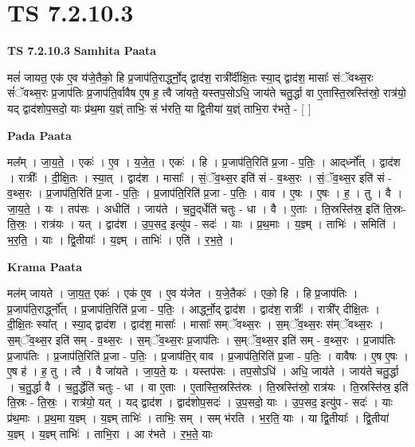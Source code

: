 \documentclass[17pt]{extarticle}
\begin{document}
\section{ TS 7.2.10.3 }

\textbf{TS 7.2.10.3 } \newline
\textbf{Samhita Paata} \newline

मलं॑ जायत॒ एक॑ ए॒व य॑जे॒तैको॒ हि प्र॒जाप॑ति॒रार्द्ध्नो॒द् द्वाद॑श॒ रात्री᳚र्दीक्षि॒तः स्या॒द् द्वाद॑श॒ मासाः᳚ संॅवथ्स॒रः सं॑ॅवथ्स॒रः प्र॒जाप॑तिः प्र॒जाप॑ति॒र्वावैष ए॒ष ह॒ त्वै जा॑यते॒ यस्तप॒सोऽधि॒ जाय॑ते चतु॒र्द्धा वा ए॒तास्ति॒स्रस्ति॑स्रो॒ रात्र॑यो॒ यद् द्वाद॑शोप॒सदो॒ याः प्र॑थ॒मा य॒ज्ञ्ं ताभिः॒ सं भ॑रति॒ या द्वि॒तीया॑ य॒ज्ञ्ं ताभि॒रा र॑भते॒ - [  ] \newline

\textbf{Pada Paata} \newline

मल᳚म् । जा॒य॒ते॒ । एकः॑ । ए॒व । य॒जे॒त॒ । एकः॑ । हि । प्र॒जाप॑ति॒रिति॑ प्र॒जा - प॒तिः॒ । आद्‌र्ध्नो᳚त् । द्वाद॑श । रात्रीः᳚ । दी॒क्षि॒तः । स्या॒त् । द्वाद॑श । मासाः᳚ । सं॒ॅव॒थ्स॒र इति॑ सं - व॒थ्स॒रः । सं॒ॅव॒थ्स॒र इति॑ सं - व॒थ्स॒रः । प्र॒जाप॑ति॒रिति॑ प्र॒जा - प॒तिः॒ । प्र॒जाप॑ति॒रिति॑ प्र॒जा - प॒तिः॒ । वाव । ए॒षः । ए॒षः । ह॒ । तु । वै । जा॒य॒ते॒ । यः । तप॑सः । अधीति॑ । जाय॑ते । च॒तु॒द्‌र्धेति॑ चतुः - धा । वै । ए॒ताः । ति॒स्रस्ति॑स्र॒ इति॑ ति॒स्रः-ति॒स्रः॒ । रात्र॑यः । यत् । द्वाद॑श । उ॒प॒सद॒ इत्यु॑प - सदः॑ । याः । प्र॒थ॒माः । य॒ज्ञ्म् । ताभिः॑ । समिति॑ । भ॒र॒ति॒ । याः । द्वि॒तीयाः᳚ । य॒ज्ञ्म् । ताभिः॑ । एति॑ । र॒भ॒ते॒ ।  \newline


\textbf{Krama Paata} \newline

मल॑म् जायते । जा॒य॒त॒ एकः॑ । एक॑ ए॒व । ए॒व य॑जेत । य॒जे॒तैकः॑ । एको॒ हि । हि प्र॒जाप॑तिः । प्र॒जाप॑ति॒रार्द्ध्नो᳚त् । प्र॒जाप॑ति॒रिति॑ प्र॒जा - प॒तिः॒ । आर्द्ध्नो॒द् द्वाद॑श । द्वाद॑श॒ रात्रीः᳚ । रात्री᳚र् दीक्षि॒तः । दी॒क्षि॒तः स्या᳚त् । 
स्या॒द् द्वाद॑श । द्वाद॑श॒ मासाः᳚ । मासाः᳚ सम्ॅवथ्स॒रः । स॒म्ॅव॒थ्स॒रः स॑म्ॅवथ्स॒रः । स॒म्ॅव॒थ्स॒र इति॑ सम् - व॒थ्स॒रः । स॒म्ॅव॒थ्स॒रः प्र॒जाप॑तिः । स॒म्ॅव॒थ्स॒र इति॑ सम् - व॒थ्स॒रः । प्र॒जाप॑तिः प्र॒जाप॑तिः । प्र॒जाप॑ति॒रिति॑ प्र॒जा - प॒तिः॒ । प्र॒जाप॑ति॒र् वाव । प्र॒जाप॑ति॒रिति॑ प्र॒जा - प॒तिः॒ । वावैषः । ए॒ष ए॒षः । ए॒ष ह॑ । ह॒ तु । त्वै । वै जा॑यते । जा॒य॒ते॒ यः । यस्तप॑सः । तप॒सोऽधि॑ । अधि॒ जाय॑ते । जाय॑ते चतु॒र्द्धा । च॒तु॒र्द्धा वै । च॒तु॒र्द्धेति॑ चतुः - धा । वा ए॒ताः । ए॒तास्ति॒स्रस्ति॑स्रः । ति॒स्रस्ति॑स्रो॒ रात्र॑यः । ति॒स्रस्ति॑स्र॒ इति॑ ति॒स्रः - ति॒स्रः॒ । रात्र॑यो॒ यत् । यद् द्वाद॑श । द्वाद॑शोप॒सदः॑ । उ॒प॒सदो॒ याः । उ॒प॒सद॒ इत्यु॑प - सदः॑ । याः प्र॑थ॒माः । प्र॒थ॒मा य॒ज्ञ्म् । य॒ज्ञ्म् ताभिः॑ । ताभिः॒ सम् । सम् भ॑रति । भ॒र॒ति॒ याः । या द्वि॒तीयाः᳚ । द्वि॒तीया॑ य॒ज्ञ्म् । य॒ज्ञ्म् ताभिः॑ । ताभि॒रा । आ र॑भते । र॒भ॒ते॒ याः \newline
\end{document}
